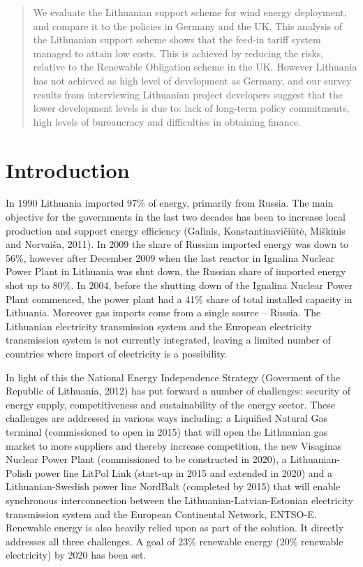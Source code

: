 \documentclass[a4paper, 12pt]{article}
\begin{document}

\begin{abstract}
We evaluate the Lithuanian support scheme for wind energy deployment, and compare it to the policies in Germany and the UK. This analysis of the Lithuanian support scheme shows that the feed-in tariff system managed to attain low costs. This is achieved by reducing the risks, relative to the Renewable Obligation scheme in the UK. However Lithuania has not achieved as high level of development as Germany, and our survey results from interviewing Lithuanian project developers suggest that the lower development levels is due to: lack of long-term policy commitments, high levels of bureaucracy and difficulties in obtaining finance.
\end{abstract}

\newpage

\tableofcontents

\newpage

\section{Introduction}

In 1990 Lithuania imported 97\% of energy, primarily from Russia. The main objective for the governments in the last two decades has been to increase local production and support energy efficiency (Galinis, Konstantinavičiūtė, Miškinis and Norvaiša, 2011). In 2009 the share of Russian imported energy was down to 56\%, however after December 2009 when the last reactor in Ignalina Nuclear Power Plant in Lithuania was shut down, the Russian share of imported energy shot up to 80\%. In 2004, before the shutting down of the Ignalina Nuclear Power Plant commenced, the power plant had a 41\% share of total installed capacity in Lithuania. Moreover gas imports come from a single source – Russia. The Lithuanian electricity transmission system and the European electricity transmission system is not currently integrated, leaving a limited number of countries where import of electricity is a possibility.

In light of this the National Energy Independence Strategy (Goverment of the Republic of Lithuania, 2012) has put forward a number of challenges: security of energy supply, competitiveness and sustainability of the energy sector. These challenges are addressed in various ways including: a Liquified Natural Gas terminal (commissioned to open in 2015) that will open the Lithuanian gas market to more suppliers and thereby increase competition, the new Visaginas Nuclear Power Plant (commissioned to be constructed in 2020), a Lithuanian-Polish power line LitPol Link (start-up in 2015 and extended in 2020) and a Lithuanian-Swedish power line NordBalt (completed by 2015) that will enable synchronous interconnection between the Lithuanian-Latvian-Estonian electricity transmission system and the European Continental Network, ENTSO-E. Renewable energy is also heavily relied upon as part of the solution. It directly addresses all three challenges. A goal of 23\% renewable energy (20\% renewable electricity) by 2020 has been set.
\end{document}
